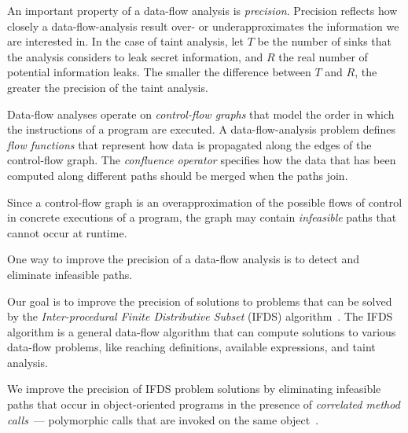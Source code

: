 {An important property of a data-flow analysis is \textit{precision}.
Precision reflects how closely a data-flow-analysis result over- or underapproximates the information we are interested in. In the case of taint analysis, let $T$ be the number of sinks that the analysis considers to leak secret information, and $R$ the real number of potential information leaks. The smaller the difference between $T$ and $R$, the greater the precision of the taint analysis.

Data-flow analyses operate on \textit{control-flow graphs} that model the order in which the instructions of a program are executed.
A data-flow-analysis problem defines \textit{flow functions} that represent how data is propagated along the edges of the control-flow graph. The \textit{confluence operator} specifies how the data that has been computed along different paths should be merged when the paths join.

Since a control-flow graph is an overapproximation of the possible flows of control in concrete executions of a program, the graph may contain \textit{infeasible} paths that cannot occur at runtime.

One way to improve the precision of a data-flow analysis is to detect and eliminate infeasible paths.

Our goal is to improve the precision of solutions to problems that can be solved by the \textit{Inter-procedural Finite Distributive Subset} (IFDS) algorithm~\cite{reps1995precise}.
The IFDS algorithm is a general data-flow algorithm that can compute solutions to various data-flow problems, like reaching definitions, available expressions, and taint analysis.

We improve the precision of IFDS problem solutions by eliminating infeasible paths that occur in object-oriented programs in the presence of \textit{correlated method calls}~--- polymorphic calls that are invoked on the same object~\cite{DBLP:journals/scp/Tip15}.
}

